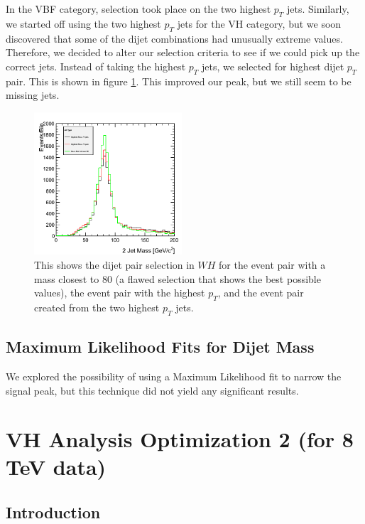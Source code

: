 \documentclass[12pt]{article}
\begin{document}
In the VBF category, selection took place on the two highest $p_{T}$ jets. 
Similarly, we started off using the two highest $p_{T}$ jets for the VH category, 
but we soon discovered that some of the dijet combinations had unusually extreme values. 
Therefore, we decided to alter our selection criteria to see if we could pick up the correct jets. 
Instead of taking the highest $p_{T}$ jets, we selected for highest dijet $p_{T}$ pair. This is shown 
in figure \ref{fig:dijetSel}. This improved our peak, but we still seem to be missing jets.
\begin{figure}[!hbtp]
\begin{center}
    \includegraphics[width=0.49\textwidth]{images/Hist_Reco2PlotsPt30Eta2.png}
    \caption{ \label{fig:dijetSel}
         This shows the dijet pair selection in $WH$ for the event pair with a mass closest to 80 (a flawed selection that 
	 shows the best possible values), the event pair with the highest $p_{T}$, and the event pair created from the two highest $p_{T}$ jets.
      }
\end{center}
\end{figure}

\subsection{Maximum Likelihood Fits for Dijet Mass}

We explored the possibility of using a Maximum Likelihood fit to narrow the signal peak, but this technique did not yield any significant results.

\section{VH Analysis Optimization 2 (for 8 TeV data)}

\subsection{Introduction}
\end{document}
